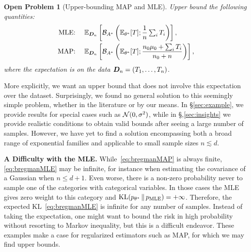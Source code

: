 \documentclass[twoside]{article}
\newtheorem{problem}{Open Problem}
\newcommand*{\expect}[2][]{\ensuremath{\mathbb{E}_{#1} \left[ #2 \right] }} %
\newcommand{\logpart}{A}
\newcommand{\bregmanconj}{\cB_{\logpart^*}}
\newcommand{\nat}{\theta}
\newcommand{\m}{\mu}
\begin{document}
\begin{problem}[Upper-bounding MAP and MLE]
Upper bound the following quantities:
\begin{align}
	\label{eq:bregmanMLE}
	\text{MLE: } \quad &\expect[\mD_n]{\bregmanconj \left (\E_{\nat^*} [T] ;  \inv{n}  \smallsum_i T_i \right )}, \\
	\label{eq:bregmanMAP}
	\text{MAP: } \quad &\expect[\mD_n]{\bregmanconj \left (\E_{\nat^*} [T] ; \frac{n_0 \m_0 + \smallsum_i T_i}{n_0+n} \right )},
\end{align}
where the expectation is on the data ${\bm{D}}_n = (T_1, \dots, T_n)$.
\end{problem}

More explicitly, we want an upper bound that does not involve this expectation over the dataset.
Surprisingly, we found no general solution to this seemingly simple problem, whether in the literature or by our means.
In \S\ref{sec:example}, we provide results for special cases such as ${\mathcal N}(0, \sigma^2)$,
while in \S,\ref{sec:insights} we provide realistic conditions to obtain valid bounds after seeing a large number of samples.
However, we have yet to find a solution encompassing both a broad range of exponential families
and applicable to small sample sizes $n \lesssim d$.

{\bf A Difficulty with the MLE.}
While~\eqref{eq:bregmanMAP} is always finite, \eqref{eq:bregmanMLE} may be infinite,
for instance when estimating the covariance of a Gaussian when $n \leq d + 1$.
Even worse, there is a non-zero probability never to sample one of the categories with categorical variables.
In those cases the MLE gives zero weight to this category and $\KL(p_{\nat^*} \,\Vert\, p_\text{MLE} ) = +\infty$.
Therefore, the expected KL~\eqref{eq:bregmanMLE} is infinite for any number of samples.
Instead of taking the expectation, one might want to bound the risk in high probability
without resorting to Markov inequality, but this is a difficult endeavor.
These examples make a case for regularized estimators such as MAP,
for which we may find upper bounds.
\end{document}

